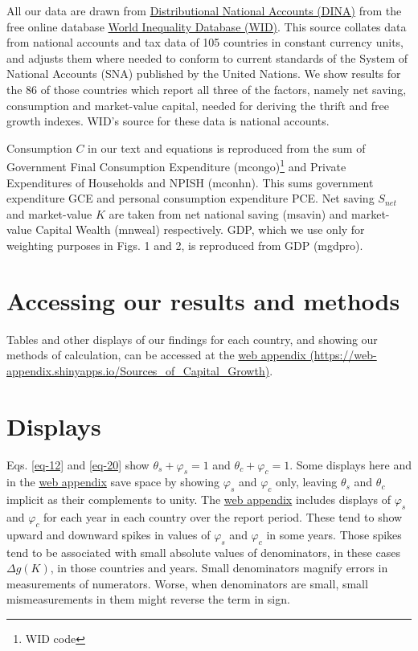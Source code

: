 \documentclass[a4paper,fleqn]{latex_styles/cas-sc}
\begin{document}
All our data are drawn from \href{https://wid.world/document/distributional-national-accounts-guidelines-2020-concepts-and-methods-used-in-the-world-inequality-database/}{Distributional National Accounts (DINA)} from the free online database \href{wid.world.com}{World
Inequality Database (WID)}. This source collates data from national accounts and tax data
of 105 countries in constant currency units, and adjusts them where needed to conform to current standards of the System of National Accounts
(SNA) published by the United Nations. We show results for the 86 of
those countries which report all three of the factors, namely net
saving, consumption and market-value capital, needed for deriving
the thrift and free growth indexes. WID's source for these data is national accounts.

Consumption $C$ in our text and equations is reproduced from the sum of Government Final Consumption Expenditure (mcongo)\footnote{\label{widnote}WID code} and Private Expenditures of Households and NPISH (mconhn). This sums government expenditure GCE and personal consumption expenditure PCE. Net saving $S_{net}$ and market-value $K$ are taken from net national saving (msavin) and market-value Capital Wealth (mnweal) respectively. GDP, which we use only for weighting purposes in Figs. 1 and 2, is reproduced from GDP (mgdpro).

\hypertarget{accessing-our-results-and-methods}{%
\section{Accessing our results and
methods}\label{accessing-our-results-and-methods}}

Tables and other displays of our findings for each country, and showing
our methods of calculation, can be accessed at the
\href{https://web-appendix.shinyapps.io/Sources\_of\_Capital\_Growth/}{web appendix (https://web-appendix.shinyapps.io/Sources\_of\_Capital\_Growth)}.

\hypertarget{sec-displays}{%
\section{Displays}\label{sec-displays}}

Eqs. \eqref{eq-12} and \eqref{eq-20} show
\(\theta_s + \varphi_s = 1\) and \(\theta_c + \varphi_c = 1\). Some
displays here and in the
\href{https://web-appendix.shinyapps.io/Sources\_of\_Capital\_Growth/}{web appendix}
save space by showing \(\varphi_s\) and \(\varphi_c\) only, leaving
\(\theta_s\) and \(\theta_c\) implicit as their complements to unity.
The \href{https://web-appendix.shinyapps.io/Sources\_of\_Capital\_Growth/}{web
appendix} includes displays of \(\varphi_s\) and \(\varphi_c\) for
each year in each country over the report period. These tend to show
upward and downward spikes in values of \(\varphi_s\) and \(\varphi_c\)
in some years. Those spikes tend to be associated with small absolute
values of denominators, in these cases \(\Delta g(K)\), in those
countries and years. Small denominators magnify errors in measurements
of numerators. Worse, when denominators are small, small mismeasurements in them might reverse the term in sign.
\end{document}
